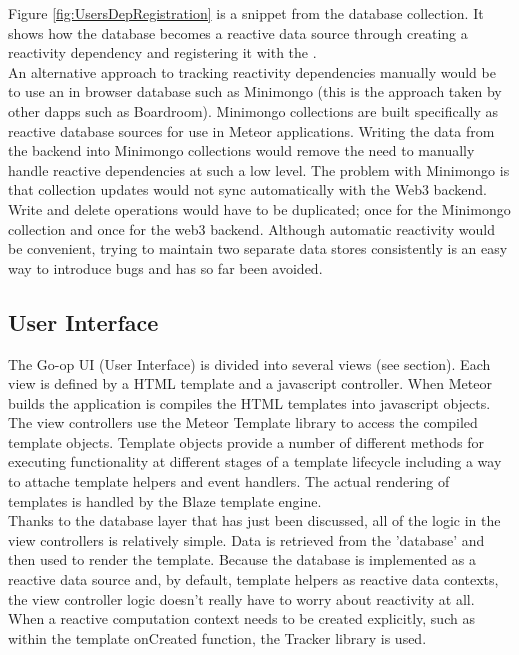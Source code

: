 Figure \ref{fig:UsersDepRegistration} is a snippet from the  database collection. It shows how the database becomes a reactive data source through creating a reactivity dependency and registering it with the . \\

An alternative approach to tracking reactivity dependencies manually would be to use an in browser database such as Minimongo (this is the approach taken by other dapps such as Boardroom). Minimongo collections are built specifically as reactive database sources for use in Meteor applications. Writing the data from the backend into Minimongo collections would remove the need to manually handle reactive dependencies at such a low level. The problem with Minimongo is that collection updates would not sync automatically with the Web3 backend. Write and delete operations would have to be duplicated; once for the Minimongo collection and once for the web3 backend. Although automatic reactivity would be convenient, trying to maintain two separate data stores consistently is an easy way to introduce bugs and has so far been avoided.\\

\subsection{User Interface}
The Go-op UI (User Interface) is divided into several views (see section). Each view is defined by a HTML template and a javascript controller. When Meteor builds the application is compiles the HTML templates into javascript objects. The view controllers use the Meteor Template library to access the compiled template objects. Template objects provide a number of different methods for executing functionality at different stages of a template lifecycle including a way to attache template helpers and event handlers. The actual rendering of templates is handled by the Blaze template engine. \\

Thanks to the database layer that has just been discussed, all of the logic in the view controllers is relatively simple. Data is retrieved from the 'database' and then used to render the template. Because the database is implemented as a reactive data source and, by default, template helpers as reactive data contexts, the view controller logic doesn't really have to worry about reactivity at all. When a reactive computation context needs to be created explicitly, such as within the template onCreated function, the Tracker library is used. \\

